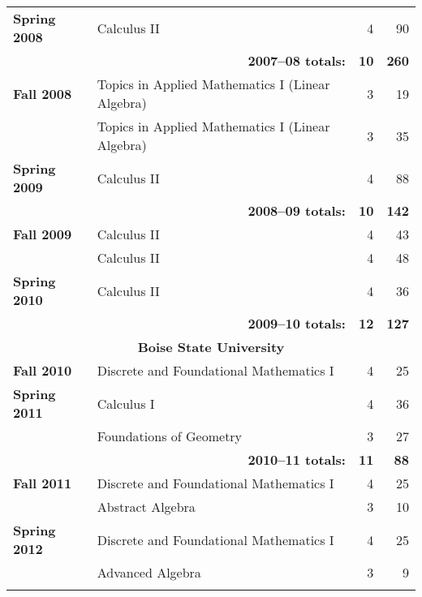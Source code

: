 \documentclass[12pt]{article}
\begin{document}
\begin{center}
\begin{longtable}{@{} l @{\hspace{1ex}} l @{} rr @{}}
\textbf{Spring 2008} & Calculus II & 4 & 90 \\
 \cmidrule{2-4}
 & \multicolumn{1}{r}{\textbf{2007--08 totals:}} & \textbf{10} & \textbf{260} \\
 \cmidrule{2-4}

\textbf{Fall 2008} & Topics in Applied Mathematics I (Linear Algebra) & 3 & 19 \\
 & Topics in Applied Mathematics I (Linear Algebra) & 3 & 35 \\
\addlinespace[0.1in]

\textbf{Spring 2009} & Calculus II & 4 & 88 \\
 \cmidrule{2-4}
 & \multicolumn{1}{r}{\textbf{2008--09 totals:}} & \textbf{10} & \textbf{142} \\
 \cmidrule{2-4}

\textbf{Fall 2009} & Calculus II & 4 & 43 \\
 & Calculus II & 4 & 48 \\
\addlinespace[0.1in]

\textbf{Spring 2010} & Calculus II & 4 & 36 \\
 \cmidrule{2-4}
 & \multicolumn{1}{r}{\textbf{2009--10 totals:}} & \textbf{12} & \textbf{127} \\

\midrule

\multicolumn{4}{c}{\textbf{Boise State University}} \\
\addlinespace[0.1in]

\textbf{Fall 2010} & Discrete and Foundational Mathematics I & 4 & 25 \\
\addlinespace[0.1in]

\textbf{Spring 2011} & Calculus I & 4 & 36 \\
 & Foundations of Geometry & 3 & 27 \\
 \cmidrule{2-4}
 & \multicolumn{1}{r}{\textbf{2010--11 totals:}} & \textbf{11} & \textbf{88} \\
 \cmidrule{2-4}

\textbf{Fall 2011} & Discrete and Foundational Mathematics I & 4 & 25 \\
 & Abstract Algebra & 3 & 10 \\
\addlinespace[0.1in]

\textbf{Spring 2012} & Discrete and Foundational Mathematics I & 4 & 25 \\
 & Advanced Algebra & 3 & 9 \\
\addlinespace[0.1in]


\end{longtable}
\end{center}
\end{document}
